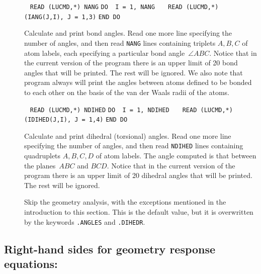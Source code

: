 \begin{description}
\item[]\verb| |\newline
\verb|READ (LUCMD,*) NANG|\newline
\verb|DO  I = 1, NANG|\newline
\verb|   READ (LUCMD,*) (IANG(J,I), J = 1,3)|\newline
\verb|END DO|

Calculate and print
bond angles. Read one
more line specifying the number of angles, and then read \verb|NANG|
lines containing triplets $A,B,C$ of atom labels, each
specifying a particular bond angle~$\angle ABC$. Notice that in the
current version of the program there is an upper limit of 20 bond
angles that will be printed. The rest will be ignored. We also note
that program always will print the angles between atoms defined to be
bonded to each other on the basis of the van der Waals radii of the atoms.

\item[]\verb| |\newline
\verb|READ (LUCMD,*) NDIHED|\newline
\verb|DO  I = 1, NDIHED|\newline
\verb|   READ (LUCMD,*) (IDIHED(J,I), J = 1,4)|\newline
\verb|END DO|

Calculate and print dihedral
(torsional) angles.  Read one more line specifying the number of angles,
and then read \verb|NDIHED| lines containing quadruplets $A,B,C,D$ of atom
labels.  The angle computed is that between the planes~$ABC$
and $BCD$. Notice that in the current version of the program there is
an upper limit of 20 dihedral angles that will be printed. The rest
will be ignored.

\item[] Skip the geometry analysis, with the exceptions
mentioned in the introduction to this section. This is the default
value, but it is overwritten by the keywords \verb|.ANGLES| and
\verb|.DIHEDR|.
\end{description}

\subsection{Right-hand sides for geometry response equations: }

